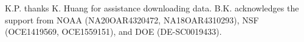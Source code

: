 \documentclass{ametsocV6.1}
\begin{document}
%

%

\clearpage
\acknowledgments
K.P. thanks K. Huang for assistance downloading data.  B.K. acknowledges the support from NOAA (NA20OAR4320472, NA18OAR4310293), NSF (OCE1419569, OCE1559151), and DOE (DE-SC0019433).  
\end{document}
